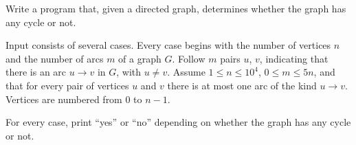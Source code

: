 

\Statement

Write a program that, given a directed graph, determines whether the graph has any cycle or not.

\Input

Input consists of several cases. Every case begins with the number of vertices $n$ and the number of arcs $m$ of a graph $G$. Follow $m$ pairs $u$, $v$, indicating that there is an arc $u \rightarrow v$ in $G$, with $u \neq v$. Assume $1 \leq n \leq 10^{4}$, $0 \leq m \leq 5n$, and that for every pair of vertices $u$ and $v$ there is at most one arc of the kind $u \rightarrow v$. Vertices are numbered from $0$ to $n-1$.

\Output

For every case, print ``yes'' or ``no'' depending on whether the graph has any cycle or not.

\Sample
